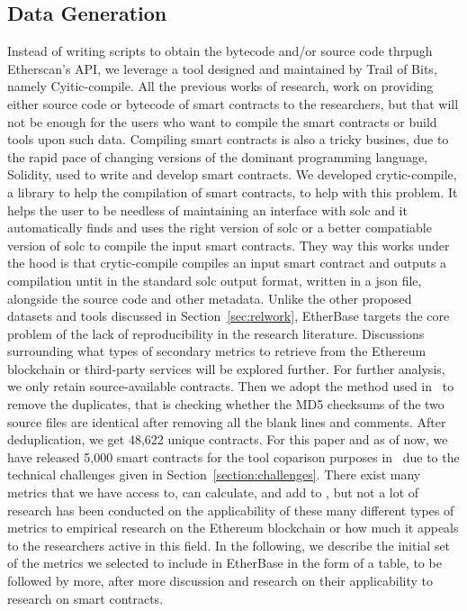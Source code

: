 	\subsection{Data Generation}
		Instead of writing scripts to obtain the bytecode and/or source code thrpugh Etherscan's API, we leverage a tool designed and maintained by Trail of Bits, namely Cyitic-compile.
		All the previous works of research, work on providing either source code or bytecode of smart contracts to the researchers, but that will not be enough for the users who want to compile the smart contracts or build tools upon such data.
		Compiling smart contracts is also a tricky busines, due to the rapid pace of changing versions of the dominant programming language, Solidity, used to write and develop smart contracts.
		We developed crytic-compile, a library to help the compilation of smart contracts, to help with this problem.
		It helps the user to be needless of maintaining an interface with solc and it automatically finds and uses the right version of solc or a better compatiable version of solc to compile the input smart contracts.
		They way this works under the hood is that crytic-compile compiles an input smart contract and outputs a compilation untit in the standard solc output format, written in a json file, alongside the source code and other metadata.
		Unlike the other proposed datasets and tools discussed in Section~\ref{sec:relwork}, EtherBase targets the core problem of the lack of reproducibility in the research literature.
		Discussions surrounding what types of secondary metrics to retrieve from the Ethereum blockchain or third-party services will be explored further.
		For further analysis, we only retain source-available contracts.
		Then we adopt the method used in~\cite{deduplicate} to remove the duplicates, that is checking whether the MD5 checksums of the two source files are identical after removing all the blank lines and comments.
		After deduplication, we get 48,622 unique contracts.
		For this paper and as of now, we have released 5,000 smart contracts for the tool coparison purposes in \etherbase~due to the technical challenges given in Section~\ref{section:challenges}.
		There exist many metrics that we have access to, can calculate, and add to \etherbase, but not a lot of research has been conducted on the applicability of these many different types of metrics to empirical research on the Ethereum blockchain or how much it appeals to the researchers active in this field.
		In the following, we describe the initial set of the metrics we selected to include in EtherBase in the form of a table, to be followed by more, after more discussion and research on their applicability to research on smart contracts.

